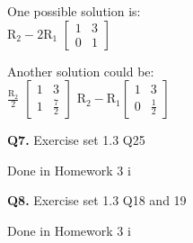 \documentclass[addpoints]{exam}
\begin{document}
\begin{sloppypar}
\begin{questions}
\begin{solution}
        One possible solution is: \\ 
        R$_2 - 2$R$_1$ $ \begin{bmatrix}
            1 & 3 \\ 0 & 1
        \end{bmatrix} $

        Another solution could be: \\ 
        $ \displaystyle\frac{\text{R$_2$}}{2} $ $ \begin{bmatrix}
            1 & 3 \\ 1 & \frac{7}{2}
        \end{bmatrix} $ \hspace*{5mm} R$_2 - $R$_1  \begin{bmatrix}
            1 & 3 \\ 0 & \frac{1}{2}
        \end{bmatrix}$
    \end{solution}

    \question
    \textbf{Q7. } Exercise set 1.3 Q25
    \begin{solution}
        Done in Homework 3 i
    \end{solution}

    \question
    \textbf{Q8. } Exercise set 1.3 Q18 and 19
    \begin{solution}
        Done in Homework 3 i
    \end{solution}

\end{questions}
\end{sloppypar}
\end{document}
